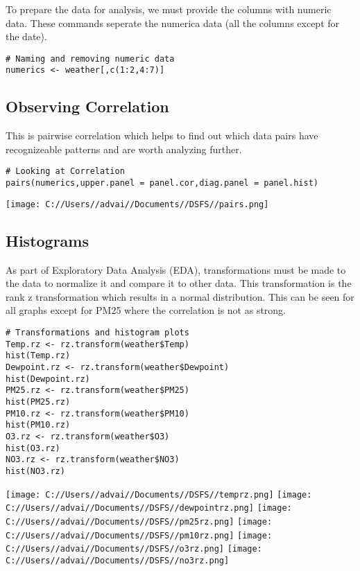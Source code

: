 \documentclass[
]{article}
\begin{document}
To prepare the data for analysis, we must provide the columns with
numeric data. These commands seperate the numerica data (all the columns
except for the date).

\begin{verbatim}
# Naming and removing numeric data
numerics <- weather[,c(1:2,4:7)]
\end{verbatim}

\hypertarget{observing-correlation}{%
\subsection{Observing Correlation}\label{observing-correlation}}

This is pairwise correlation which helps to find out which data pairs
have recognizeable patterns and are worth analyzing further.

\begin{verbatim}
# Looking at Correlation
pairs(numerics,upper.panel = panel.cor,diag.panel = panel.hist)
\end{verbatim}

\texttt{[image: C://Users//advai//Documents//DSFS//pairs.png]}

\hypertarget{histograms}{%
\subsection{Histograms}\label{histograms}}

As part of Exploratory Data Analysis (EDA), transformations must be made
to the data to normalize it and compare it to other data. This
transformation is the rank z transformation which results in a normal
distribution. This can be seen for all graphs except for PM25 where the
correlation is not as strong.

\begin{verbatim}
# Transformations and histogram plots
Temp.rz <- rz.transform(weather$Temp)
hist(Temp.rz)
Dewpoint.rz <- rz.transform(weather$Dewpoint)
hist(Dewpoint.rz)
PM25.rz <- rz.transform(weather$PM25)
hist(PM25.rz)
PM10.rz <- rz.transform(weather$PM10)
hist(PM10.rz)
O3.rz <- rz.transform(weather$O3)
hist(O3.rz)
NO3.rz <- rz.transform(weather$NO3)
hist(NO3.rz)
\end{verbatim}

\texttt{[image: C://Users//advai//Documents//DSFS//temprz.png]}
\texttt{[image: C://Users//advai//Documents//DSFS//dewpointrz.png]}
\texttt{[image: C://Users//advai//Documents//DSFS//pm25rz.png]}
\texttt{[image: C://Users//advai//Documents//DSFS//pm10rz.png]}
\texttt{[image: C://Users//advai//Documents//DSFS//o3rz.png]}
\texttt{[image: C://Users//advai//Documents//DSFS//no3rz.png]}
\end{document}
